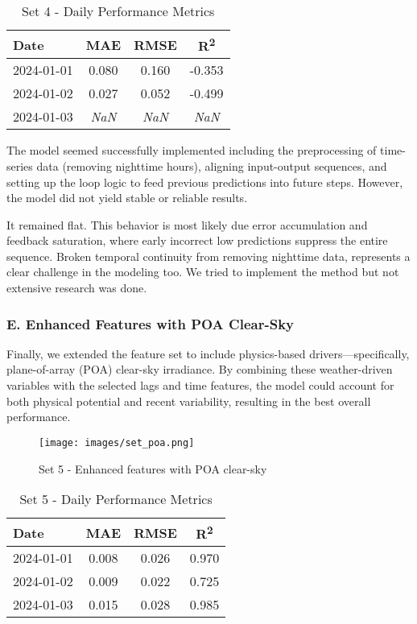 \begin{table}[H]
    \centering
    \begin{tabular}{lccc}
        Date        & MAE    & RMSE   & R\textsuperscript{2} \\
        \hline
        2024-01-01  & 0.080  & 0.160  & -0.353 \\
        2024-01-02  & 0.027  & 0.052  & -0.499 \\
        2024-01-03  & \textit{NaN}    & \textit{NaN}    & \textit{NaN} \\
    \end{tabular}
    \caption{Set 4 - Daily Performance Metrics}
\end{table}

The model seemed successfully implemented including the preprocessing of time-series 
data (removing nighttime hours), aligning input-output sequences, and setting up the loop 
logic to feed previous predictions into future steps. However, the model did not yield 
stable or reliable results. 

It remained flat. This behavior is most likely due error accumulation and feedback saturation, 
where early incorrect low predictions suppress the entire sequence. Broken temporal continuity 
from removing nighttime data, represents a clear challenge in the modeling too. We tried to 
implement the method but not extensive research was done.  

\subsubsection*{E. Enhanced Features with POA Clear-Sky}
Finally, we extended the feature set to include physics-based drivers—specifically, 
plane-of-array (POA) clear-sky irradiance. By combining these weather-driven variables 
with the selected lags and time features, the model could account for both physical 
potential and recent variability, resulting in the best overall performance.

\begin{figure}[H]
    \centering
    \texttt{[image: images/set\_poa.png]}
    \caption{Set 5 - Enhanced features with POA clear-sky}
    \label{fig:set5-forecast-profile}
\end{figure}

\begin{table}[H]
    \centering
    \begin{tabular}{lccc}
        Date        & MAE    & RMSE   & R\textsuperscript{2} \\
        \hline
        2024-01-01  & 0.008  & 0.026  & 0.970 \\
        2024-01-02  & 0.009  & 0.022  & 0.725 \\
        2024-01-03  & 0.015  & 0.028  & 0.985 \\
    \end{tabular}
    \caption{Set 5 - Daily Performance Metrics}
\end{table}

